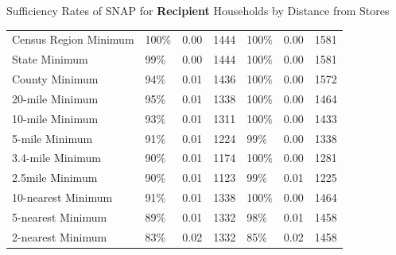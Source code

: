 \documentclass{beamer}
\begin{document}
\begin{frame}
\begin{table}[htbp]{Sufficiency Rates of SNAP for \textbf{Recipient} Households by Distance from Stores}
\begin{adjustbox}{height=1.5in}
\begin{tabular}{lllllll}
    Census Region Minimum & 100\% & 0.00  & 1444  & 100\% & 0.00  & 1581 \\
    State Minimum & 99\%  & 0.00  & 1444  & 100\% & 0.00  & 1581 \\
    County Minimum & 94\%  & 0.01  & 1436  & 100\% & 0.00  & 1572 \\
    20-mile Minimum & 95\%  & 0.01  & 1338  & 100\% & 0.00  & 1464 \\
    10-mile Minimum & 93\%  & 0.01  & 1311  & 100\% & 0.00  & 1433 \\
    5-mile Minimum & 91\%  & 0.01  & 1224  & 99\%  & 0.00  & 1338 \\
    3.4-mile Minimum & 90\%  & 0.01  & 1174  & 100\% & 0.00  & 1281 \\
    2.5mile Minimum & 90\%  & 0.01  & 1123  & 99\%  & 0.01  & 1225 \\
    10-nearest Minimum & 91\%  & 0.01  & 1338  & 100\% & 0.00  & 1464 \\
    5-nearest Minimum & 89\%  & 0.01  & 1332  & 98\%  & 0.01  & 1458 \\
    2-nearest Minimum & 83\%  & 0.02  & 1332  & 85\%  & 0.02  & 1458 \\
    \bottomrule
    \end{tabular}
    \end{adjustbox}
	\end{table}

\end{frame}


\end{document}
